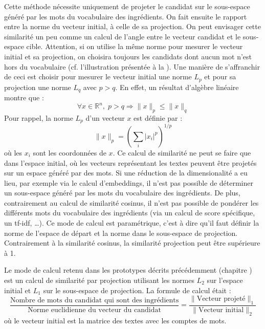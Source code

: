             Cette méthode nécessite uniquement de projeter le candidat sur le sous-espace généré par les mots du vocabulaire des ingrédients.
            On fait ensuite le rapport entre la norme du vecteur initial, à celle de sa projection. 
            On peut envisager cette similarité un peu comme un calcul de l'angle entre le vecteur candidat et le sous-espace cible.
            Attention, si on utilise la même norme pour mesurer le vecteur initial et sa projection, on choisira toujours les candidats dont aucun mot n'est hors du vocabulaire (cf. l'illustration présentée à la ).
            Une manière de s'affranchir de ceci est choisir pour mesurer le vecteur initial une norme $L_{p}$ et pour sa projection une norme $L_{q}$ avec $p > q$.
            En effet, un résultat d'algèbre linéaire~\cite{lpnorms} montre que :
            \[\forall x \in \mathbb{R}^{n}, \; p > q \Rightarrow \lVert x \rVert_{p} \leqslant \lVert x \rVert_{q}\]
            Pour rappel, la norme $L_{p}$ d'un vecteur $x$ est définie par : 
            \[\lVert x \rVert_{p} = \left( \sum_{i} |x_{i}|^{p} \right)^{1/p} \]
            où les $x_{i}$ sont les coordonnées de $x$.
            Ce calcul de similarité ne peut se faire que dans l'espace initial, où les vecteurs représentant les textes peuvent être projetés sur un espace généré par des mots.
            Si une réduction de la dimensionalité a eu lieu, par exemple via le calcul d'embeddings, il n'est pas possible de déterminer un sous-espace généré par les mots du vocabulaire des ingrédients.
            De plus, contrairement au calcul de similarité cosinus, il n'est pas possible de pondérer les différents mots du vocabulaire des ingrédients (via un calcul de score spécifique, un tf-idf, \dots).
            Ce mode de calcul est paramétrique, c'est à dire qu'il faut définir la norme de l'espace de départ et la norme dans le sous-espace de projection.
            Contrairement à la similarité cosinus, la similarité projection peut être supérieure à 1.

            Le mode de calcul retenu dans les prototypes décrits précédemment (chapitre ) est un calcul de similarité par projection utilisant les normes $L_{2}$ sur l'espace initial et $L_{1}$ sur le sous-espace de projection.
            La formule de calcul était : 
            \[\frac{\text{Nombre de mots du candidat qui sont des ingrédients}}{\text{Norme euclidienne du vecteur du candidat}} = \frac{\lVert\text{Vecteur projeté}\rVert_{1}}{\lVert\text{Vecteur initial}\rVert_{2}}\]
            où le vecteur initial est la matrice des textes avec les comptes de mots.

